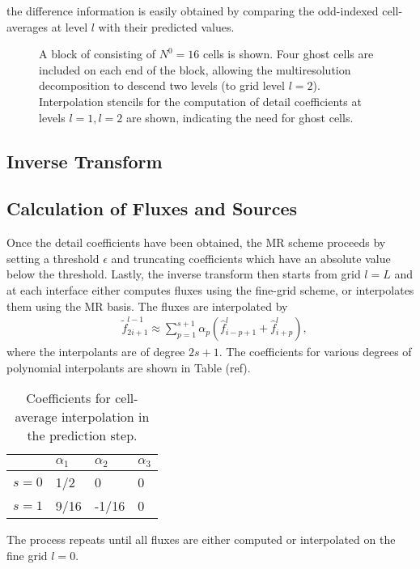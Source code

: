 \documentclass[12pt,letterpaper]{article}
\begin{document}
    the difference information is
    easily obtained by comparing the odd-indexed cell-averages at level $l$ with
    their predicted values.

    \begin{figure}[H]
        \center
        
        \caption{A block of consisting of $N^{0} = 16$ cells is shown. Four
        ghost cells are included on each end of the block, allowing the
        multiresolution decomposition to descend two levels (to grid level
        $l=2$). Interpolation stencils for the computation of detail
        coefficients at levels $l=1, l=2$ are shown, indicating the need for ghost cells.}
    \end{figure}

\subsection*{Inverse Transform}

    
\subsection*{Calculation of Fluxes and Sources}
    Once the detail coefficients have been obtained, the MR scheme
    proceeds by setting a threshold $\epsilon$ and truncating coefficients
    which have an absolute value below the threshold. Lastly, the inverse
    transform then starts from grid $l=L$ and at each interface either
    computes fluxes using the fine-grid scheme, or interpolates them using
    the MR basis. The fluxes are interpolated by
    \begin{align}
        & \tilde{f}_{2i+1}^{l-1} \approx \sum_{p=1}^{s+1} \alpha_{p} \left(
        \hat{f}^{l}_{i-p+1} + \hat{f}^{l}_{i+p} \right),
    \end{align}
    where the interpolants are of degree $2s+1$. The coefficients for
    various degrees of polynomial interpolants are shown in Table (ref).
    \begin{table}
        \centering
        \begin{tabular}{|l|l|l|l|}
        \hline
            & $\alpha_{1}$ & $\alpha_{2}$ & $\alpha_{3}$ \\ \hline
            $s=0$ & 1/2 & 0 & 0 \\ \hline
            $s=1$ & 9/16 & -1/16 & 0 \\ \hline
        \end{tabular}
        \caption{Coefficients for cell-average interpolation in the prediction step.}
    \end{table}
    The process repeats until all fluxes are either computed or
    interpolated on the fine grid $l=0$.
\end{document}
